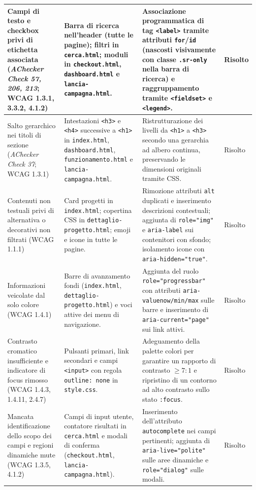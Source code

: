 \documentclass[11pt, a4paper]{article}
\begin{document}
\begin{longtable}{|
>{\raggedright\arraybackslash}p{3.1cm}|
>{\raggedright\arraybackslash}p{4.5cm}|
>{\raggedright\arraybackslash}p{5.5cm}|
>{\raggedright\arraybackslash}p{2.5cm}|}
Campi di testo e checkbox privi di etichetta associata (\textit{AChecker Check 57, 206, 213}; WCAG 1.3.1, 3.3.2, 4.1.2) & Barra di ricerca nell'header (tutte le pagine); filtri in \texttt{cerca.html}; moduli in \texttt{checkout.html}, \texttt{dashboard.html} e \texttt{lancia-campagna.html}. & Associazione programmatica di tag \texttt{<label>} tramite attributi \texttt{for}/\texttt{id} (nascosti visivamente con classe \texttt{.sr-only} nella barra di ricerca) e raggruppamento tramite \texttt{<fieldset>} e \texttt{<legend>}. & Risolto \\
\hline
Salto gerarchico nei titoli di sezione (\textit{AChecker Check 37}; WCAG 1.3.1) & Intestazioni \texttt{<h3>} e \texttt{<h4>} successive a \texttt{<h1>} in \texttt{index.html}, \texttt{dashboard.html}, \texttt{funzionamento.html} e \texttt{lancia-campagna.html}. & Ristrutturazione dei livelli da \texttt{<h1>} a \texttt{<h3>} secondo una gerarchia ad albero continua, preservando le dimensioni originali tramite CSS. & Risolto \\
\hline
Contenuti non testuali privi di alternativa o decorativi non filtrati (WCAG 1.1.1) & Card progetti in \texttt{index.html}; copertina CSS in \texttt{dettaglio-progetto.html}; emoji e icone in tutte le pagine. & Rimozione attributi \texttt{alt} duplicati e inserimento descrizioni contestuali; aggiunta di \texttt{role="img"} e \texttt{aria-label} sui contenitori con sfondo; isolamento icone con \texttt{aria-hidden="true"}. & Risolto \\
\hline
Informazioni veicolate dal solo colore (WCAG 1.4.1) & Barre di avanzamento fondi (\texttt{index.html}, \texttt{dettaglio-progetto.html}) e voci attive dei menu di navigazione. & Aggiunta del ruolo \texttt{role="progressbar"} con attributi \texttt{aria-valuenow/min/max} sulle barre e inserimento di \texttt{aria-current="page"} sui link attivi. & Risolto \\
\hline
Contrasto cromatico insufficiente e indicatore di focus rimosso (WCAG 1.4.3, 1.4.11, 2.4.7) & Pulsanti primari, link secondari e campi \texttt{<input>} con regola \texttt{outline: none} in \texttt{style.css}. & Adeguamento della palette colori per garantire un rapporto di contrasto $\ge 7:1$ e ripristino di un contorno ad alto contrasto sullo stato \texttt{:focus}. & Risolto \\
\hline
Mancata identificazione dello scopo dei campi e regioni dinamiche mute (WCAG 1.3.5, 4.1.2) & Campi di input utente, contatore risultati in \texttt{cerca.html} e modali di conferma (\texttt{checkout.html}, \texttt{lancia-campagna.html}). & Inserimento dell'attributo \texttt{autocomplete} nei campi pertinenti; aggiunta di \texttt{aria-live="polite"} sulle aree dinamiche e \texttt{role="dialog"} sulle modali. & Risolto \\
\end{longtable}
\normalsize
\end{document}
